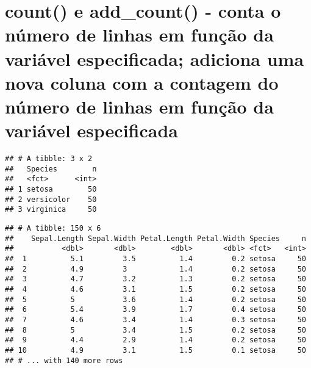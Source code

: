 \documentclass[]{book}
\newenvironment{Shaded}{\begin{snugshade}}{\end{snugshade}}
\newcommand{\KeywordTok}[1]{\textcolor[rgb]{0.13,0.29,0.53}{\textbf{#1}}}
\newcommand{\NormalTok}[1]{#1}
\newcommand{\OperatorTok}[1]{\textcolor[rgb]{0.81,0.36,0.00}{\textbf{#1}}}
\newcommand{\StringTok}[1]{\textcolor[rgb]{0.31,0.60,0.02}{#1}}
\begin{document}
\hypertarget{count-e-add_count---conta-o-nuxfamero-de-linhas-em-funuxe7uxe3o-da-variuxe1vel-especificada-adiciona-uma-nova-coluna-com-a-contagem-do-nuxfamero-de-linhas-em-funuxe7uxe3o-da-variuxe1vel-especificada}{%
\section{count() e add\_count() - conta o número de linhas em função da variável especificada; adiciona uma nova coluna com a contagem do número de linhas em função da variável especificada}\label{count-e-add_count---conta-o-nuxfamero-de-linhas-em-funuxe7uxe3o-da-variuxe1vel-especificada-adiciona-uma-nova-coluna-com-a-contagem-do-nuxfamero-de-linhas-em-funuxe7uxe3o-da-variuxe1vel-especificada}}

\begin{Shaded}
\end{Shaded}

\begin{verbatim}
## # A tibble: 3 x 2
##   Species        n
##   <fct>      <int>
## 1 setosa        50
## 2 versicolor    50
## 3 virginica     50
\end{verbatim}

\begin{Shaded}
\end{Shaded}

\begin{verbatim}
## # A tibble: 150 x 6
##    Sepal.Length Sepal.Width Petal.Length Petal.Width Species     n
##           <dbl>       <dbl>        <dbl>       <dbl> <fct>   <int>
##  1          5.1         3.5          1.4         0.2 setosa     50
##  2          4.9         3            1.4         0.2 setosa     50
##  3          4.7         3.2          1.3         0.2 setosa     50
##  4          4.6         3.1          1.5         0.2 setosa     50
##  5          5           3.6          1.4         0.2 setosa     50
##  6          5.4         3.9          1.7         0.4 setosa     50
##  7          4.6         3.4          1.4         0.3 setosa     50
##  8          5           3.4          1.5         0.2 setosa     50
##  9          4.4         2.9          1.4         0.2 setosa     50
## 10          4.9         3.1          1.5         0.1 setosa     50
## # ... with 140 more rows
\end{verbatim}
\end{document}
